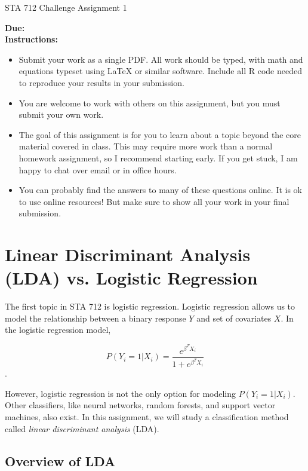 \documentclass[11pt]{article}
\begin{document}
\begin{center}
\Large
STA 712 Challenge Assignment 1\\
\normalsize
\vspace{5mm}
\end{center}

\noindent \textbf{Due:} \\ 

\noindent \textbf{Instructions:} 
\begin{itemize}
\item Submit your work as a single PDF. All work should be typed, with math and equations typeset using LaTeX or similar software. Include all R code needed to reproduce your results in your submission.
\item You are welcome to work with others on this assignment, but you must submit your own work.
\item The goal of this assignment is for you to learn about a topic beyond the core material covered in class. This may require more work than a normal homework assignment, so I recommend starting early. If you get stuck, I am happy to chat over email or in office hours.
\item You can probably find the answers to many of these questions online. It is ok to use online resources! But make sure to show all your work in your final submission.
\end{itemize}

\section*{Linear Discriminant Analysis (LDA) vs. Logistic Regression}

The first topic in STA 712 is logistic regression. Logistic regression allows us to model the relationship between a binary response $Y$ and set of covariates $X$. In the logistic regression model,

$$P(Y_i = 1 | X_i) = \dfrac{e^{\beta^T X_i}}{1 + e^{\beta^T X_i}}$$.

\noindent However, logistic regression is not the only option for modeling $P(Y_i = 1 | X_i)$. Other classifiers, like neural networks, random forests, and support vector machines, also exist. In this assignment, we will study a classification method called \textit{linear discriminant analysis} (LDA).

\subsection*{Overview of LDA}
\end{document}
